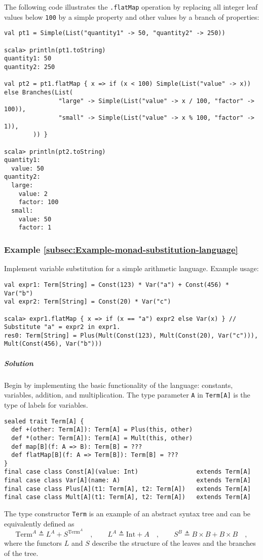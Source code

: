 The following code illustrates the \lstinline!.flatMap! operation
by replacing all integer leaf values below \lstinline!100! by a simple
property and other values by a branch of properties:
\begin{lstlisting}
val pt1 = Simple(List("quantity1" -> 50, "quantity2" -> 250))

scala> println(pt1.toString)
quantity1: 50
quantity2: 250

val pt2 = pt1.flatMap { x => if (x < 100) Simple(List("value" -> x)) else Branches(List(
               "large" -> Simple(List("value" -> x / 100, "factor" -> 100)),
               "small" -> Simple(List("value" -> x % 100, "factor" -> 1)),
        )) }

scala> println(pt2.toString)
quantity1:
  value: 50
quantity2:
  large:
    value: 2
    factor: 100
  small:
    value: 50
    factor: 1
\end{lstlisting}


\subsubsection{Example \label{subsec:Example-monad-substitution-language}\ref{subsec:Example-monad-substitution-language}}

Implement variable substitution for a simple arithmetic language.
Example usage:
\begin{lstlisting}
val expr1: Term[String] = Const(123) * Var("a") + Const(456) * Var("b")
val expr2: Term[String] = Const(20) * Var("c")

scala> expr1.flatMap { x => if (x == "a") expr2 else Var(x) } // Substitute "a" = expr2 in expr1.
res0: Term[String] = Plus(Mult(Const(123), Mult(Const(20), Var("c"))), Mult(Const(456), Var("b"))) 
\end{lstlisting}


\subparagraph{Solution}

Begin by implementing the basic functionality of the language: constants,
variables, addition, and multiplication. The type parameter \lstinline!A!
in \lstinline!Term[A]! is the type of labels for variables. 
\begin{lstlisting}
sealed trait Term[A] {
  def +(other: Term[A]): Term[A] = Plus(this, other)
  def *(other: Term[A]): Term[A] = Mult(this, other)
  def map[B](f: A => B): Term[B] = ???
  def flatMap[B](f: A => Term[B]): Term[B] = ???
}
final case class Const[A](value: Int)                extends Term[A]
final case class Var[A](name: A)                     extends Term[A]
final case class Plus[A](t1: Term[A], t2: Term[A])   extends Term[A]
final case class Mult[A](t1: Term[A], t2: Term[A])   extends Term[A]
\end{lstlisting}
The type constructor \lstinline!Term! is an example of an abstract
syntax tree and can be equivalently defined
as
\[
\text{Term}^{A}\triangleq L^{A}+S^{\text{Term}^{A}}\quad,\quad\quad L^{A}\triangleq\text{Int}+A\quad,\quad\quad S^{B}\triangleq B\times B+B\times B\quad,
\]
where the functors $L$ and $S$ describe the structure of the leaves
and the branches of the tree.

